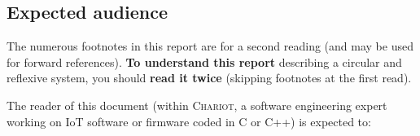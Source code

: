 \subsection{Expected audience}
\label{subsec:audience}


The numerous footnotes in this report are for a second reading (and
may be used for forward references). \textbf{To understand this report}
describing a circular and reflexive system, you should \textbf{read it
  twice} (skipping footnotes at the first read).

\bigskip

The reader of this document (within \textsc{Chariot}, a software
engineering expert  working on
IoT  software or firmware coded in C or
C++) is expected to:

